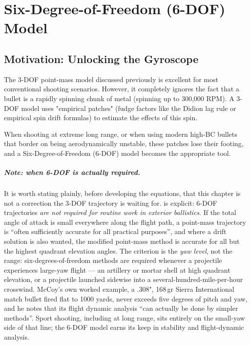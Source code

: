 \documentclass[11pt,twoside,openright]{report}
\begin{document}
\chapter{Six-Degree-of-Freedom (6-DOF) Model}
\label{ch:6dof}

\section{Motivation: Unlocking the Gyroscope}

The 3-DOF point-mass model discussed previously is excellent for most conventional shooting scenarios. However, it completely ignores the fact that a bullet is a rapidly spinning chunk of metal (spinning up to 300,000 RPM). A 3-DOF model uses "empirical patches" (fudge factors like the Didion lag rule or empirical spin drift formulas) to estimate the effects of this spin.

When shooting at extreme long range, or when using modern high-BC bullets that border on being aerodynamically unstable, these patches lose their footing, and a Six-Degree-of-Freedom (6-DOF) model becomes the appropriate tool.

\paragraph{Note: when 6-DOF is actually required.} It is worth stating plainly, before developing the equations, that this chapter is not a correction the 3-DOF trajectory is waiting for. \citet{mccoy1999modern} is explicit: 6-DOF trajectories \emph{are not required for routine work in exterior ballistics}. If the total angle of attack is small everywhere along the flight path, a point-mass trajectory is ``often sufficiently accurate for all practical purposes'', and where a drift solution is also wanted, the modified point-mass method is accurate for all but the highest quadrant elevation angles. The criterion is the \emph{yaw level}, not the range: six-degrees-of-freedom methods are required whenever a projectile experiences large-yaw flight --- an artillery or mortar shell at high quadrant elevation, or a projectile launched sidewise into a several-hundred-mile-per-hour crosswind. McCoy's own worked example, a .308", 168\,gr Sierra International match bullet fired flat to 1000 yards, never exceeds five degrees of pitch and yaw, and he notes that its flight dynamic analysis ``can actually be done by simpler methods''. Sport shooting, including at long range, sits entirely on the small-yaw side of that line; the 6-DOF model earns its keep in stability and flight-dynamic analysis.
\end{document}

